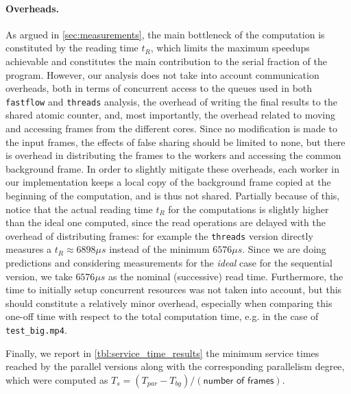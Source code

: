 \documentclass{article}
\begin{document}
\paragraph{Overheads.} As argued in \autoref{sec:measurements}, the main bottleneck of the computation is constituted by the reading time $t_R$, which limits the maximum speedups achievable and constitutes the main contribution to the serial fraction of the program. However, our analysis does not take into account communication overheads, both in terms of concurrent access to the queues used in both \texttt{fastflow} and \texttt{threads} analysis, the overhead of writing the final results to the shared atomic counter, and, most importantly, the overhead related to moving and accessing frames from the different cores.  Since no modification is made to the input frames, the effects of false sharing should be limited to none, but there is overhead in distributing the frames to the workers and accessing the common background frame. In order to slightly mitigate these overheads, each worker in our implementation keeps a local copy of the background frame copied at the beginning of the computation, and is thus not shared. Partially because of this, notice that the actual reading time $t_R$ for the computations is slightly higher than the ideal one computed, since the read operations are delayed with the overhead of distributing frames: for example the \texttt{threads} version directly measures a $t_R \approx 6898\mu s$ instead of the minimum $6576\mu s$. Since we are doing predictions and considering measurements for the \emph{ideal} case for the sequential version, we take $6576\mu s$ as the nominal (successive) read time. Furthermore, the time to initially setup concurrent resources was not taken into account, but this should constitute a relatively minor overhead, especially when comparing this one-off time with respect to the total computation time, e.g. in the case of \texttt{test\_big.mp4}.

Finally, we report in \autoref{tbl:service_time_results} the minimum service times reached by the parallel versions along with the corresponding parallelism degree, which were computed as $T_s = (T_{par} - T_{bg}) / (\textsf{number of frames})$.



%
\end{document}
